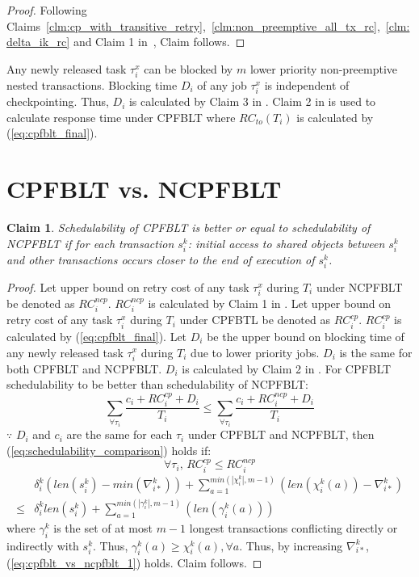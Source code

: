 \documentclass[conference]{IEEEtran}
\newtheorem{clm}{Claim}
\begin{document}
%
\begin{proof}
%
Following Claims~\ref{clm:cp_with_transitive_retry},~\ref{clm:non_preemptive_all_tx_rc},~\ref{clm:delta_ik_rc}  and Claim 1 in~\cite{fblt}, Claim follows.
%
\end{proof}
%
Any newly released task $\tau_{i}^{x}$ can be blocked by $m$ lower priority non-preemptive nested transactions. Blocking time $D_{i}$ of any job $\tau_i^x$ is independent of checkpointing. Thus, $D_i$ is calculated by Claim 3 in \cite{fblt}. Claim 2 in \cite{fblt} is used to calculate response time under CPFBLT where $RC_{to}(T_{i})$ is calculated by (\ref{eq:cpfblt_final}).
%
\section{CPFBLT vs. NCPFBLT}\label{sec:schedulabiltiy comparison}

\begin{clm}\label{clm:cp_ncp_fblt_schedulabiltiy_comp}
%
Schedulability of CPFBLT is better or equal to schedulability of NCPFBLT if for each transaction $s_i^k$: initial access to shared objects between $s_i^k$ and other transactions occurs closer to the end of execution of $s_i^k$.
%
\end{clm}
%
\begin{proof}
%
Let upper bound on retry cost of any task $\tau_{i}^{x}$ during $T_{i}$ under NCPFBLT be denoted as $RC_{i}^{ncp}$. $RC_{i}^{ncp}$ is calculated by Claim 1 in \cite{fblt}. Let upper bound on retry cost of any task $\tau_{i}^{x}$ during $T_{i}$ under CPFBTL be denoted as $RC_{i}^{cp}$. $RC_{i}^{cp}$ is calculated by (\ref{eq:cpfblt_final}). Let $D_{i}$ be the upper bound on blocking time of any newly released task $\tau_{i}^{x}$ during $T_{i}$ due to lower priority jobs. $D_{i}$ is the same for both CPFBLT and NCPFBLT. $D_{i}$ is calculated by Claim 2 in \cite{fblt}. For CPFBLT schedulability to be better than schedulability of NCPFBLT: 
%
\begin{equation}
\sum_{\forall\tau_{i}}\frac{c_{i}+RC_{i}^{cp}+D_{i}}{T_{i}}\le\sum_{\forall\tau_{i}}\frac{c_{i}+RC_{i}^{ncp}+D_{i}}{T_{i}}\label{eq:schedulability_comparison}
\end{equation}
$\because$ $D_{i}$ and $c_{i}$ are the same for each $\tau_{i}$
under CPFBLT and NCPFBLT, then (\ref{eq:schedulability_comparison})
holds if:
\[
\forall\tau_{i},\, RC_{i}^{cp}\le RC_{i}^{ncp}
\]
%
\begin{eqnarray}
 & \delta_{i}^{k}\left(len\left(s_{i}^{k}\right)-min\left(\nabla_{i*}^{k}\right)\right)+\sum_{a=1}^{min\left(|\chi_{i}^{k}|,m-1\right)}\left(len\left(\chi_{i}^{k}(a)\right)-\nabla_{i*}^{k}\right)\nonumber\\
\le & \delta_{i}^{k}len\left(s_{i}^{k}\right)+\sum_{a=1}^{min\left(|\gamma_{i}^{k}|,m-1\right)}\left(len\left(\gamma_{i}^{k}(a)\right)\right)
\label{eq:cpfblt_vs_ncpfblt_1}
\end{eqnarray}
%
where $\gamma_i^k$ is the set of at most $m-1$ longest transactions conflicting directly or indirectly with $s_i^k$. Thus, $\gamma_i^k(a) \ge \chi_i^k(a), \forall a$. Thus, by increasing $\nabla_{i*}^k$, (\ref{eq:cpfblt_vs_ncpfblt_1}) holds. Claim follows.
%
\end{proof}
%
\end{document}
